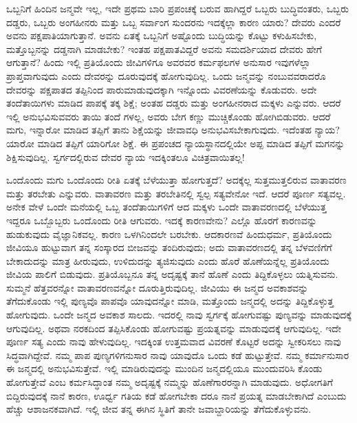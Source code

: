 ಒಬ್ಬನಿಗೆ ಹಿಂದಿನ ಜನ್ಮವೇ ಇಲ್ಲ, ಇದೇ ಪ್ರಥಮ ಬಾರಿ ಪ್ರಪಂಚಕ್ಕೆ ಬರುವ ಹಾಗಿದ್ದರೆ ಒಬ್ಬರು ಬುದ್ಧಿವಂತರು, ಒಬ್ಬರು ದಡ್ಡರು, ಒಬ್ಬರು ಅಂಗಹೀನರು ಮತ್ತು ಒಬ್ಬ ಸರ್ವಾಂಗ ಸುಂದರನು ಇದಕ್ಕೆಲ್ಲಾ ಕಾರಣ ಯಾರು? ದೇವರು ಎಂದರೆ ಅವನು ಪಕ್ಷಪಾತಿಯಾಗುತ್ತಾನೆ. ಅವನು ಏತಕ್ಕೆ ಒಬ್ಬನಿಗೆ ಅಷ್ಟೊಂದು ಬುದ್ಧಿಯನ್ನು ಕೊಟ್ಟು ಕಳುಹಿಸಬೇಕು, ಮತ್ತೊಬ್ಬನನ್ನು ದಡ್ಡನಾಗಿ ಮಾಡಬೇಕು? ಇಂತಹ ಪಕ್ಷಪಾತವಿದ್ದರೆ ಅವನು ಸಮದರ್ಶಿಯಾದ ದೇವರು ಹೇಗೆ ಆಗುತ್ತಾನೆ? ಹಿಂದು ಇಲ್ಲಿ ಪ್ರತಿಯೊಂದು ಜೀವಿಗಳಿಗೂ ಅವರವರ ಕರ್ಮಫಲಗಳ ಅನುಸಾರ ಇವುಗಳೆಲ್ಲಾ ಪ್ರಾಪ್ತವಾಗುವುದು ಎಂದು ದೇವರನ್ನು ದೂರುವುದಕ್ಕೆ ಹೋಗುವುದಿಲ್ಲ. ಒಂದು ಜನ್ಮವನ್ನು ನಂಬುವವರಾದರೊ ದೇವರನ್ನು ಪಕ್ಷಪಾತದ ತಪ್ಪಿನಿಂದ ಪಾರುಮಾಡುವುದಕ್ಕಾಗಿ ಇನ್ನೊಂದು ವಿವರಣೆಯನ್ನು ಕೊಡುವರು. ಅದೇ ತಂದೆತಾಯಿಗಳು ಮಾಡಿದ ಪಾಪಕ್ಕೆ ತಕ್ಕ ಶಿಕ್ಷೆ; ಅಂತಹ ದಡ್ಡರು ಮತ್ತು ಅಂಗಹೀನರಾದ ಮಕ್ಕಳು ಎನ್ನುವರು. ಆದರೆ ಇಲ್ಲಿ ಅನುಭವಿಸುವವರು ತಾಯಿ ತಂದೆ ಗಳಲ್ಲ, ಅವರು ಬೇಗ ಕಣ್ಣು ಮುಚ್ಚಿಕೊಂಡು ಹೋಗಿಬಿಡುವರು. ಆದರೆ ಮಗು, ಇನ್ನಾರೋ ಮಾಡಿದ ತಪ್ಪಿಗೆ ತಾನು ಶಿಕ್ಷೆಯನ್ನು ಜೀವಾವಧಿ ಅನುಭವಿಸಬೇಕಾಗುವುದು. ಇದೆಂತಹ ನ್ಯಾಯ? ಯಾರೋ ಮಾಡಿದ ತಪ್ಪಿಗೆ ಯಾರಿಗೋ ಶಿಕ್ಷೆ. ಈ ಪ್ರಪಂಚದ ನ್ಯಾಯಸ್ಥಾನದಲ್ಲಿಯೇ ಅಪ್ಪ ಮಾಡಿದ ತಪ್ಪಿಗೆ ಮಗನನ್ನು ಶಿಕ್ಷಿಸುವುದಿಲ್ಲ. ಸ್ವರ್ಗದಲ್ಲಿರುವ ದೇವರ ನ್ಯಾಯ ಇದಕ್ಕಿಂತಲೂ ವಿಚಿತ್ರವಾಯಿತಲ್ಲ!

ಒಂದೊಂದು ಮಗು ಒಂದೊಂದು ರೀತಿ ಏತಕ್ಕೆ ಬೆಳೆಯುತ್ತಾ ಹೋಗುತ್ತದೆ? ಅದಕ್ಕೆಲ್ಲ ಸುತ್ತಮುತ್ತಲಿರುವ ವಾತಾವರಣ ಮತ್ತು ತರಬೇತು ಎನ್ನುವರು. ವಾತಾವರಣ ಮತ್ತು ತರಬೇತಿನಲ್ಲಿ ಸ್ವಲ್ಪ ಸತ್ಯವೇನೋ ಇದೆ. ಆದರೆ ಪೂರ್ಣ ಸತ್ಯವಲ್ಲ. ಅನೇಕ ವೇಳೆ ಒಂದೇ ಮನೆಯಲ್ಲಿ ಒಬ್ಬ ತಂದೆತಾಯಿಗಳಿಗೆ ಆದ ಮಕ್ಕಳು ಒಂದೇ ವಾತಾವರಣದಲ್ಲಿ ಬೆಳೆಯುತ್ತ ಇದ್ದರೂ ಒಬ್ಬೊಬ್ಬರು ಒಂದೊಂದು ರೀತಿ ಆಗುವರು. ಇದಕ್ಕೆ ಕಾರಣವೇನು? ಎಲ್ಲೊ ಹೊರಗೆ ಕಾರಣವನ್ನು ಹುಡುಕುವುದು ವೈಜ್ಞಾನಿಕವಲ್ಲ. ಕಾರಣ ಒಳಗಿನಿಂದಲೇ ಬರಬೇಕು. ಆದಕಾರಣವೆ ಹಿಂದುಧರ್ಮ, ಪ್ರತಿಯೊಂದು ಜೀವಿಯೂ ಹುಟ್ಟುವಾಗ ತನ್ನ ಸಂಸ್ಕಾರದ ಬೀಜವನ್ನು ತಂದಿರುವುದು; ಅದು ವಾತಾವರಣದಲ್ಲಿ ತನ್ನ ಬೆಳವಣಿಗೆಗೆ ಬೇಕಾದುದನ್ನು ಮಾತ್ರ ಹೀರುವುದು, ಉಳಿದುದನ್ನು ತ್ಯಜಿಸುವುದು ಎಂದು ಹೊರೆ ಹೊಣೆಯನ್ನೆಲ್ಲ ಪ್ರತಿಯೊಂದು ಜೀವಿಯ ಪಾಲಿಗೆ ಬಿಡುವುದು. ಪ್ರತಿಯೊಬ್ಬನೂ ತನ್ನ ಅದೃಷ್ಟಕ್ಕೆ ತಾನೆ ಹೊಣೆ ಎಂದು ತಿದ್ದಿಕೊಳ್ಳಲು ಯತ್ನಿಸುವನು. ಸುಮ್ಮನೆ ಹೆತ್ತವರನ್ನೋ ವಾತಾವರಣವನ್ನೋ ದೂರುತ್ತಿರುವುದಿಲ್ಲ. ಜೀವಿಯು ಈ ಜನ್ಮದ ಅವಕಾಶವನ್ನು ತೆಗೆದುಕೊಂಡು ಇಲ್ಲಿ ಪುಣ್ಯವೊ ಪಾಪವೊ ಯಾವುದನ್ನೋ ಮಾಡಿ, ಮತ್ತೊಂದು ಜನ್ಮದಲ್ಲಿ ಅದನ್ನು ತಿದ್ದಿಕೊಳ್ಳುತ್ತ ಹೋಗುವುದು. ಒಂದೇ ಜನ್ಮದ ಅವಕಾಶ ಸಾಲದು. ಇದರಲ್ಲಿ ನಾವು ಸ್ವರ್ಗಕ್ಕೆ ಹೋಗುವಷ್ಟು ಪುಣ್ಯವನ್ನು ಮಾಡುವುದಕ್ಕೆ ಆಗುವುದಿಲ್ಲ. ಅಥವಾ ನರಕದಿಂದ ತಪ್ಪಿಸಿಕೊಂಡು ಹೋಗುವಷ್ಟು ಪ್ರಯತ್ನವನ್ನು ಮಾಡುವುದಕ್ಕೆ ಆಗುವುದಿಲ್ಲ. ಇದೇ ಪೂರ್ಣ ಸತ್ಯ ಎಂದು ನಾವು ಹೇಳುವುದಿಲ್ಲ. ಇದಕ್ಕಿಂತ ಉತ್ತಮವಾದ ವಿವರಣೆ ಕೊಟ್ಟರೆ ಅದನ್ನು ಸ್ವೀಕರಿಸಲು ನಾವು ಸಿದ್ಧವಾಗಿದ್ದೇವೆ. ನಮ್ಮ ಪಾಪ ಪುಣ್ಯಗಳಿಗನುಸಾರ ನಾವು ಯಾವುದೊ ಒಂದು ಕಡೆ ಹುಟ್ಟುತ್ತೇವೆ. ನಮ್ಮ ಕರ್ಮಾನುಸಾರ ಈ ಜನ್ಮದಲ್ಲಿ ಅನುಭವಿಸುತ್ತೇವೆ. ಇಲ್ಲಿ ಮಾಡಿರುವುದನ್ನು ಮುಂದಿನ ಜನ್ಮದಲ್ಲಿಯೂ ಮುಂದುವರಿಸಿ ಕೊಂಡು ಹೋಗುತ್ತೇವೆ ಎಂಬ ಕರ್ಮಸಿದ್ಧಾಂತ ನಮ್ಮ ಅದೃಷ್ಟಕ್ಕೆ ನಮ್ಮನ್ನು ಹೊಣೆಗಾರರನ್ನಾಗಿ ಮಾಡುವುದು. ಅಧೋಗತಿಗೆ ಬಿದ್ದಿರುವುದಕ್ಕೆ ನಾನೆ ಕಾರಣ, ಊರ್ಧ್ವ ಗತಿಯ ಕಡೆ ಹೋಗಬೇಕಾ ದರೂ ನಾನೆ ಪ್ರಯತ್ನ ಮಾಡಬೇಕಾಗಿದೆ ಎಂಬುದು ಹೆಚ್ಚು ಆಶಾಜನಕವಾಗಿದೆ. ಇಲ್ಲಿ ಜೀವ ತನ್ನ ಈಗಿನ ಸ್ಥಿತಿಗೆ ತಾನೇ ಜವಾಬ್ದಾರಿಯನ್ನು ತೆಗೆದುಕೊಳ್ಳುವನು.

